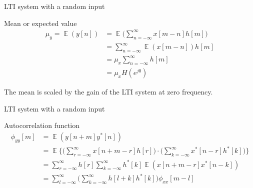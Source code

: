 \documentclass[10pt]{beamer}
\DeclareMathOperator{\E}{\mathbb{E}} %
\begin{document}
%
\begin{frame}{LTI system with a random input}

\begin{block}{Mean or expected value}
	\begin{align*}
	\mu_y = \E(y[n]) &= \E\bigg(\sum_{n=-\infty}^{\infty} x[m-n]h[m]\bigg) \\
	&= \sum_{n=-\infty}^{\infty} \E(x[m-n])h[m] \tag{Expectation is a linear operator and $h[n]$ is not random} \\
	&= \mu_x\sum_{n=-\infty}^{\infty} h[m] \tag{Assuming $x[n]$ is WSS} \\
	&= \mu_xH(e^{j0})
	\end{align*}
\end{block}

The mean is scaled by the gain of the LTI system at zero frequency.
\end{frame}

\begin{frame}{LTI system with a random input}

\begin{block}{Autocorrelation function}
	\begin{align} \nonumber
	\phi_{yy}[m] &= \E(y[n+m]y^*[n]) \tag{by definition}  \\ \nonumber
	&= \E\bigg\lbrace\bigg(\sum_{r=-\infty}^{\infty} x[n+m-r]h[r]\bigg)\cdot\bigg(\sum_{k=-\infty}^{\infty} x^*[n-r]h^*[k]\bigg)\bigg\rbrace  \\ \nonumber
	&= \sum_{r=-\infty}^{\infty} h[r] \sum_{k=-\infty}^{\infty} h^*[k]\E(x[n+m-r]x^*[n-k]) \\
	&= \sum_{l=-\infty}^{\infty} \bigg(\sum_{k=-\infty}^{\infty} h[l+k]h^*[k]\bigg)\phi_{xx}[m-l] \tag{change variables $r = l+k$}
	\end{align}
\end{block}
\end{frame}
\end{document}
